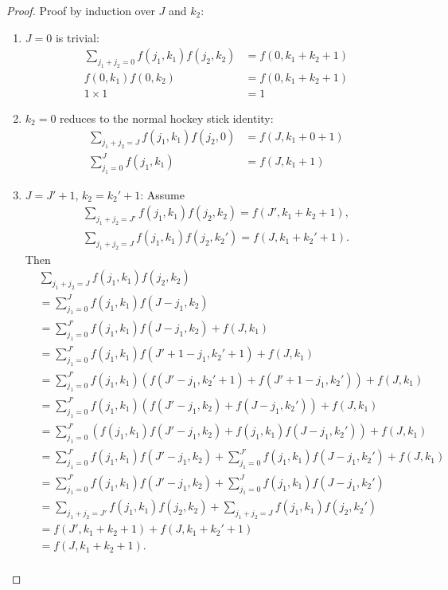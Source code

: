 \documentclass{article}
\begin{document}
\begin{proof}
Proof by induction over $J$ and $k_2$:
\begin{enumerate}
\item $J=0$ is trivial:
  \begin{align*}
    \sum_{j_1+j_2=0}f(j_1, k_1)f(j_2, k_2) &= f(0, k_1+k_2+1) \\
    f(0, k_1)f(0, k_2) &= f(0, k_1+k_2+1) \\
    1\times1 &= 1
  \end{align*}
\item $k_2=0$ reduces to the normal hockey stick identity:
  \begin{align*}
    \sum_{j_1+j_2=J}f(j_1, k_1)f(j_2, 0) &= f(J, k_1+0+1) \\
    \sum_{j_1=0}^{J}f(j_1, k_1) &= f(J, k_1+1)
  \end{align*}
\item $J=J'+1$, $k_2=k_2'+1$: Assume
  \begin{align*}
    \sum_{j_1+j_2=J'}f(j_1, k_1)f(j_2, k_2) = f(J', k_1+k_2+1), \\
    \sum_{j_1+j_2=J}f(j_1, k_1)f(j_2, k_2') = f(J, k_1+k_2'+1).
  \end{align*}
  Then
  \begin{align*}
    & \sum_{j_1+j_2=J}f(j_1, k_1)f(j_2, k_2) \\
    &= \sum_{j_1=0}^{J}f(j_1, k_1)f(J-j_1, k_2) \\
    &= \sum_{j_1=0}^{J'}f(j_1, k_1)f(J-j_1, k_2)+f(J, k_1) \\
    &= \sum_{j_1=0}^{J'}f(j_1, k_1)f(J'+1-j_1, k_2'+1)+f(J, k_1) \\
    &= \sum_{j_1=0}^{J'}f(j_1, k_1)(f(J'-j_1, k_2'+1)+f(J'+1-j_1, k_2'))+f(J, k_1) \\
    &= \sum_{j_1=0}^{J'}f(j_1, k_1)(f(J'-j_1, k_2)+f(J-j_1, k_2'))+f(J, k_1) \\
    &= \sum_{j_1=0}^{J'}(f(j_1, k_1)f(J'-j_1, k_2)+f(j_1, k_1)f(J-j_1, k_2'))+f(J, k_1) \\
    &= \sum_{j_1=0}^{J'}f(j_1, k_1)f(J'-j_1, k_2)+\sum_{j_1=0}^{J'}f(j_1, k_1)f(J-j_1, k_2')+f(J, k_1) \\
    &= \sum_{j_1=0}^{J'}f(j_1, k_1)f(J'-j_1, k_2)+\sum_{j_1=0}^{J}f(j_1, k_1)f(J-j_1, k_2') \\
    &= \sum_{j_1+j_2=J'}f(j_1, k_1)f(j_2, k_2)+\sum_{j_1+j_2=J}f(j_1, k_1)f(j_2, k_2') \\
    &= f(J', k_1+k_2+1)+f(J, k_1+k_2'+1) \\
    &= f(J, k_1+k_2+1). \\
  \end{align*}
\end{enumerate}

\end{proof}
\end{document}
